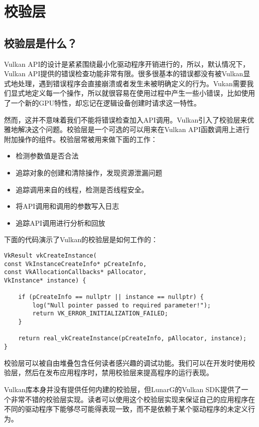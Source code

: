 \section{校验层}

\subsection{校验层是什么？}

Vulkan API的设计是紧紧围绕最小化驱动程序开销进行的，所以，默认情况下，Vulkan API提供的错误检查功能非常有限。很多很基本的错误都没有被Vulkan显式地处理，遇到错误程序会直接崩溃或者发生未被明确定义的行为。Vukan需要我们显式地定义每一个操作，所以就很容易在使用过程中产生一些小错误，比如使用了一个新的GPU特性，却忘记在逻辑设备创建时请求这一特性。

然而，这并不意味着我们不能将错误检查加入API调用。Vulkan引入了校验层来优雅地解决这个问题。校验层是一个可选的可以用来在Vulkan API函数调用上进行附加操作的组件。校验层常被用来做下面的工作：

\begin{itemize}
	\item 检测参数值是否合法
	\item 追踪对象的创建和清除操作，发现资源泄漏问题
	\item 追踪调用来自的线程，检测是否线程安全。
	\item 将API调用和调用的参数写入日志
	\item 追踪API调用进行分析和回放
\end{itemize}

下面的代码演示了Vulkan的校验层是如何工作的：

\begin{lstlisting}[language={[ANSI]C}]
VkResult vkCreateInstance(
const VkInstanceCreateInfo* pCreateInfo,
const VkAllocationCallbacks* pAllocator,
VkInstance* instance) {

	if (pCreateInfo == nullptr || instance == nullptr) {
		log("Null pointer passed to required parameter!");
		return VK_ERROR_INITIALIZATION_FAILED;
	}

	return real_vkCreateInstance(pCreateInfo, pAllocator, instance);
}
\end{lstlisting}

校验层可以被自由堆叠包含任何读者感兴趣的调试功能。我们可以在开发时使用校验层，然后在发布应用程序时，禁用校验层来提高程序的运行表现。

Vulkan库本身并没有提供任何内建的校验层，但LunarG的Vulkan SDK提供了一个非常不错的校验层实现。读者可以使用这个校验层实现来保证自己的应用程序在不同的驱动程序下能够尽可能得表现一致，而不是依赖于某个驱动程序的未定义行为。

